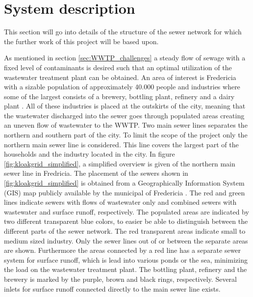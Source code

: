 \chapter{System description}\label{se:system_description}
This section will go into details of the structure of the sewer network for which the further work of this project will be based upon.

As mentioned in section \ref{sec:WWTP_challenges} a steady flow of sewage with a fixed level of contaminants is desired such that an optimal utilization of the wastewater treatment plant can be obtained. An area of interest is Fredericia with a sizable population of approximately 40.000 people and industries where some of the largest consists of a brewery, bottling plant, refinery and a dairy plant \cite{Statistic_Denmark}. All of these industries is placed at the outskirts of the city, meaning that the wastewater discharged into the sewer goes through populated areas creating an uneven flow of wastewater to the WWTP. Two main sewer lines separates the northern and southern part of the city. To limit the scope of the project only the northern main sewer line is considered. This line covers the largest part of the households and the industry located in the city. %
In figure \ref{fig:kloakgrid_simplified}, a simplified overview is given of the northern main sewer line in Fredricia. The placement of the sewers shown in \ref{fig:kloakgrid_simplified} is obtained from a Geographically Information System (GIS) map publicly available by the municipal of Fredericia \cite{GIS_kort}. The red and green lines indicate sewers with flows of wastewater only and combined sewers with wastewater and surface runoff, respectively. The populated areas are indicated by two different transparent blue colors, to easier be able to distinguish between the different parts of the sewer network. The red transparent areas indicate small to medium sized industry. 
Only the sewer lines out of or between the separate areas are shown. Furthermore the areas connected by a red line has a separate sewer system for surface runoff, which is lead into various ponds or the sea, minimizing the load on the wastewater treatment plant.
The bottling plant, refinery and the brewery is marked by the purple, brown and black rings, respectively. Several inlets for surface runoff connected directly to the main sewer line exists. %



